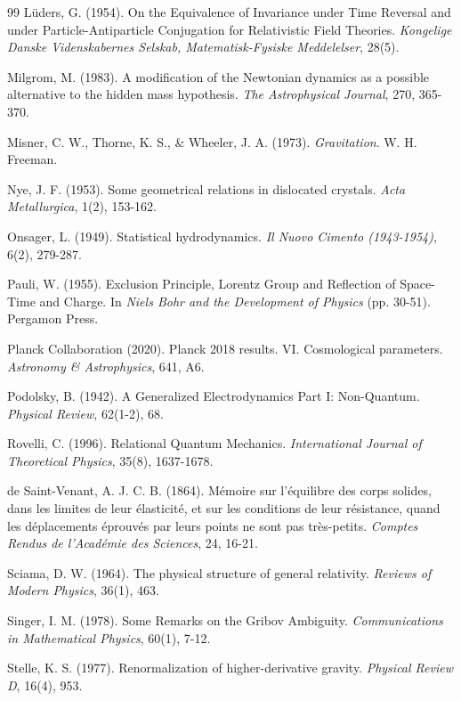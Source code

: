 \begin{thebibliography}{99}
L\"{u}ders, G. (1954). On the Equivalence of Invariance under Time Reversal and under Particle-Antiparticle Conjugation for Relativistic Field Theories. \textit{Kongelige Danske Videnskabernes Selskab, Matematisk-Fysiske Meddelelser}, 28(5).

Milgrom, M. (1983). A modification of the Newtonian dynamics as a possible alternative to the hidden mass hypothesis. \textit{The Astrophysical Journal}, 270, 365-370.

Misner, C. W., Thorne, K. S., \& Wheeler, J. A. (1973). \textit{Gravitation}. W. H. Freeman.

Nye, J. F. (1953). Some geometrical relations in dislocated crystals. \textit{Acta Metallurgica}, 1(2), 153-162.

Onsager, L. (1949). Statistical hydrodynamics. \textit{Il Nuovo Cimento (1943-1954)}, 6(2), 279-287.

Pauli, W. (1955). Exclusion Principle, Lorentz Group and Reflection of Space-Time and Charge. In \textit{Niels Bohr and the Development of Physics} (pp. 30-51). Pergamon Press.

Planck Collaboration (2020). Planck 2018 results. VI. Cosmological parameters. \textit{Astronomy \& Astrophysics}, 641, A6.

Podolsky, B. (1942). A Generalized Electrodynamics Part I: Non-Quantum. \textit{Physical Review}, 62(1-2), 68.

Rovelli, C. (1996). Relational Quantum Mechanics. \textit{International Journal of Theoretical Physics}, 35(8), 1637-1678.

de Saint-Venant, A. J. C. B. (1864). M\'emoire sur l'\'equilibre des corps solides, dans les limites de leur \'elasticit\'e, et sur les conditions de leur r\'esistance, quand les d\'eplacements \'eprouv\'es par leurs points ne sont pas tr\`es-petits. \textit{Comptes Rendus de l'Acad\'emie des Sciences}, 24, 16-21.

Sciama, D. W. (1964). The physical structure of general relativity. \textit{Reviews of Modern Physics}, 36(1), 463.

Singer, I. M. (1978). Some Remarks on the Gribov Ambiguity. \textit{Communications in Mathematical Physics}, 60(1), 7-12.

Stelle, K. S. (1977). Renormalization of higher-derivative gravity. \textit{Physical Review D}, 16(4), 953.


\end{thebibliography}
